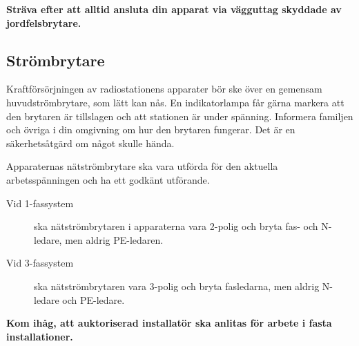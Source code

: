 \begin{center}
\begin{minipage}{0.19\columnwidth}
\Huge{\selectfont{}\relax}
\end{minipage}
\begin{minipage}{0.7\columnwidth}
\textbf{Sträva efter att alltid ansluta din apparat via vägguttag
	skyddade av jordfelsbrytare.}
\end{minipage}
\end{center}


\subsection{Strömbrytare}

Kraftförsörjningen av radiostationens apparater bör ske över en
gemensam huvudströmbrytare, som lätt kan nås.
En indikatorlampa får gärna markera att den brytaren är tillslagen och att
stationen är under spänning.
Informera familjen och övriga i din omgivning om hur den brytaren fungerar.
Det är en säkerhetsåtgärd om något skulle hända.

Apparaternas nätströmbrytare ska vara utförda för den aktuella arbetsspänningen
och ha ett godkänt utförande.

\begin{description}
\item[Vid 1-fassystem] ska nätströmbrytaren i apparaterna vara 2-polig och bryta fas-
och N-ledare, men aldrig PE-ledaren.

\item[Vid 3-fassystem] ska nätströmbrytaren vara 3-polig och bryta fasledarna, men
aldrig N-ledare och PE-ledare.
\end{description}

\begin{center}
\begin{minipage}{0.19\columnwidth}
\Huge{\selectfont{}\relax}
\end{minipage}
\begin{minipage}{0.7\columnwidth}
\textbf{Kom ihåg, att auktoriserad installatör ska anlitas för arbete
i fasta installationer.}
\end{minipage}
\end{center}

